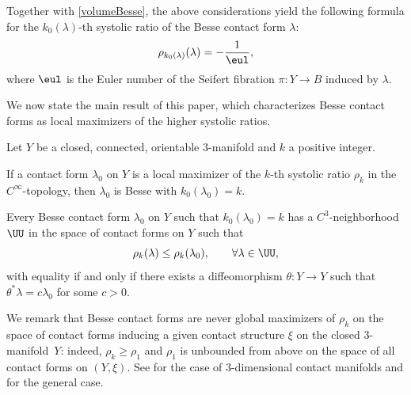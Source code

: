 Together with \eqref{volumeBesse}, the above considerations yield the following formula for the $k_0(\lambda)$-th systolic ratio of the Besse contact form $\lambda$:
\[
\rho_{k_0(\lambda)} (\lambda) = - \frac{1}{\eul},
\]
where $\eul$ is the Euler number of the Seifert fibration $\pi:Y\to B$ induced by $\lambda$.

We now state the main result of this paper, which characterizes Besse contact forms as local maximizers of the higher systolic ratios.

\begin{maintheorem}
\label{t:main}
Let $Y$ be a closed, connected, orientable $3$-manifold and $k$ a positive integer.
\begin{enumeratei}
\item\label{t:maini}
 If a contact form $\lambda_0$ on $Y$ is a local maximizer of the $k$-th systolic ratio $\rho_k$ in the $C^{\infty}$-topology, then $\lambda_0$ is Besse with $k_0(\lambda_0)=k$.

\item\label{t:mainii}
Every Besse contact form $\lambda_0$ on $Y$ such that $k_0(\lambda_0)=k$ has a $C^3$-neighbor\-hood~$\UU$ in the space of contact forms on $Y$ such that
\[
\rho_k(\lambda) \leq \rho_k(\lambda_0), \qquad \forall \lambda\in \UU,
\]
with equality if and only if there exists a diffeomorphism $\theta:Y\to Y$ such that $\theta^*\lambda=c\lambda_0$ for some $c>0$.
\end{enumeratei}
\end{maintheorem}

We remark that Besse contact forms are never global maximizers of $\rho_k$ on the space of contact forms inducing a given contact structure $\xi$ on the closed $3$-manifold~$Y$: indeed, $\rho_k\geq \rho_1$ and $\rho_1$ is unbounded from above on the space of all contact forms on $(Y,\xi)$. See \cite{Abbondandolo:2019ta} for the case of 3-dimensional contact manifolds and \cite{Saglam:2018tb} for the general case.

